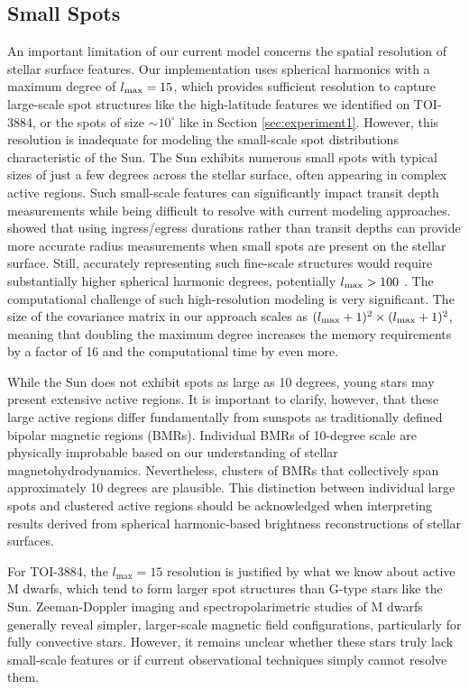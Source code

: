 \documentclass[twocolumn]{aastex631}
\begin{document}
\subsection{Small Spots} \label{sec:smallspots}
An important limitation of our current model concerns the spatial resolution of stellar surface features. 
Our implementation uses spherical harmonics with a maximum degree of $l_{\rm max}=15$, which provides sufficient 
resolution to capture large-scale spot structures like the high-latitude features we identified on TOI-3884, or the spots of size 
$\sim 10^\circ$ like in Section \ref{sec:experiment1}. 
However, this resolution is inadequate for modeling the small-scale spot distributions characteristic of the Sun.
The Sun exhibits numerous small spots with typical sizes of just a few degrees across the stellar surface, often appearing 
in complex active regions. Such small-scale features can significantly impact transit depth measurements while being difficult 
to resolve with current modeling approaches. \cite{Morrisradius} showed that using ingress/egress durations rather than 
transit depths can provide more accurate radius measurements when small spots are present on the stellar surface.
Still, accurately representing such fine-scale structures would require substantially higher spherical 
harmonic degrees, potentially $l_{\rm max} > 100$ \citep{Solanki2003}. The computational challenge of such high-resolution modeling is very significant. 
The size of the covariance matrix in our approach scales as $(l_{\rm max}+1)^2 \times (l_{\rm max}+1)^2$, meaning that 
doubling the maximum degree increases the memory requirements by a factor of 16 and the computational time by even more.

While the Sun does not exhibit spots as large as 10 degrees, young stars may present extensive active regions. It is important 
to clarify, however, that these large active regions differ fundamentally from sunspots as traditionally defined bipolar 
magnetic regions (BMRs). Individual BMRs of 10-degree scale are physically improbable based on our understanding of 
stellar magnetohydrodynamics. Nevertheless, clusters of BMRs that collectively span approximately 10 degrees are 
plausible. This distinction between individual large spots and clustered active regions should be acknowledged when 
interpreting results derived from spherical harmonic-based brightness reconstructions of stellar surfaces.

For TOI-3884, the $l_{\text{max}}=15$ resolution is justified by what we know about active M dwarfs, which tend to form 
larger spot structures than G-type stars like the Sun. Zeeman-Doppler imaging and spectropolarimetric studies of M dwarfs 
generally reveal simpler, larger-scale magnetic field configurations, particularly for fully convective stars. 
However, it remains unclear whether these stars truly lack small-scale features or if current observational techniques 
simply cannot resolve them.
\end{document}
